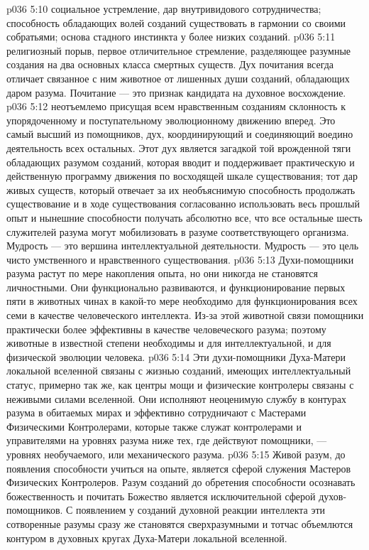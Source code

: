\vs p036 5:10 \bibnobreakspace {} социальное устремление, дар внутривидового сотрудничества; способность обладающих волей созданий существовать в гармонии со своими собратьями; основа стадного инстинкта у более низких созданий.
\vs p036 5:11 \bibnobreakspace {} религиозный порыв, первое отличительное стремление, разделяющее разумные создания на два основных класса смертных существ. Дух почитания всегда отличает связанное с ним животное от лишенных души созданий, обладающих даром разума. Почитание --- это признак кандидата на духовное восхождение.
\vs p036 5:12 \bibnobreakspace {} неотъемлемо присущая всем нравственным созданиям склонность к упорядоченному и поступательному эволюционному движению вперед. Это самый высший из помощников, дух, координирующий и соединяющий воедино деятельность всех остальных. Этот дух является загадкой той врожденной тяги обладающих разумом созданий, которая вводит и поддерживает практическую и действенную программу движения по восходящей шкале существования; тот дар живых существ, который отвечает за их необъяснимую способность продолжать существование и в ходе существования согласованно использовать весь прошлый опыт и нынешние способности получать абсолютно все, что все остальные шесть служителей разума могут мобилизовать в разуме соответствующего организма. Мудрость --- это вершина интеллектуальной деятельности. Мудрость --- это цель чисто умственного и нравственного существования.
\vs p036 5:13 \pc Духи\hyp{}помощники разума растут по мере накопления опыта, но они никогда не становятся личностными. Они функционально развиваются, и функционирование первых пяти в животных чинах в какой\hyp{}то мере необходимо для функционирования всех семи в качестве человеческого интеллекта. Из\hyp{}за этой животной связи помощники практически более эффективны в качестве человеческого разума; поэтому животные в известной степени необходимы и для интеллектуальной, и для физической эволюции человека.
\vs p036 5:14 Эти духи\hyp{}помощники Духа\hyp{}Матери локальной вселенной связаны с жизнью созданий, имеющих интеллектуальный статус, примерно так же, как центры мощи и физические контролеры связаны с неживыми силами вселенной. Они исполняют неоценимую службу в контурах разума в обитаемых мирах и эффективно сотрудничают с Мастерами Физическими Контролерами, которые также служат контролерами и управителями на уровнях разума ниже тех, где действуют помощники, --- уровнях необучаемого, или механического разума.
\vs p036 5:15 Живой разум, до появления способности учиться на опыте, является сферой служения Мастеров Физических Контролеров. Разум созданий до обретения способности осознавать божественность и почитать Божество является исключительной сферой духов\hyp{}помощников. С появлением у созданий духовной реакции интеллекта эти сотворенные разумы сразу же становятся сверхразумными и тотчас объемлются контуром в духовных кругах Духа\hyp{}Матери локальной вселенной.
